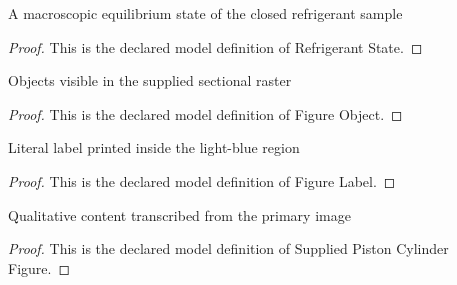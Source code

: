 \begin{definition}
  \label{def:physics:phyx-mini-0462:phyxminiproblems-problemphyxmini0462-refrigerantstate}
  A macroscopic equilibrium state of the closed refrigerant sample
\end{definition}
\begin{proof}
  This is the declared model definition of Refrigerant State.
\end{proof}
\begin{definition}
  \label{def:physics:phyx-mini-0462:phyxminiproblems-problemphyxmini0462-figureobject}
  Objects visible in the supplied sectional raster
\end{definition}
\begin{proof}
  This is the declared model definition of Figure Object.
\end{proof}
\begin{definition}
  \label{def:physics:phyx-mini-0462:phyxminiproblems-problemphyxmini0462-figurelabel}
  Literal label printed inside the light-blue region
\end{definition}
\begin{proof}
  This is the declared model definition of Figure Label.
\end{proof}
\begin{definition}
  \label{def:physics:phyx-mini-0462:phyxminiproblems-problemphyxmini0462-suppliedpistoncylinderfigure}
  Qualitative content transcribed from the primary image
\end{definition}
\begin{proof}
  This is the declared model definition of Supplied Piston Cylinder Figure.
\end{proof}
